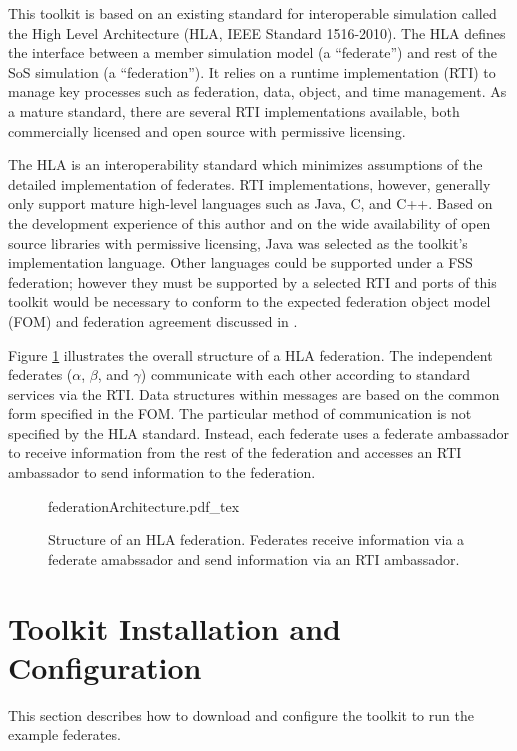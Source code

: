 \documentclass[]{article}
\begin{document}
This toolkit is based on an existing standard for interoperable simulation called the High Level Architecture (HLA, IEEE Standard 1516-2010). The HLA defines the interface between a member simulation model (a ``federate'') and rest of the SoS simulation (a ``federation''). It relies on a runtime implementation (RTI) to manage key processes such as federation, data, object, and time management. As a mature standard, there are several RTI implementations available, both commercially licensed and open source with permissive licensing.

The HLA is an interoperability standard which minimizes assumptions of the detailed implementation of federates. RTI implementations, however, generally only support mature high-level languages such as Java, C, and C++. Based on the development experience of this author and on the wide availability of open source libraries with permissive licensing, Java was selected as the toolkit's implementation language. Other languages could be supported under a FSS federation; however they must be supported by a selected RTI and ports of this toolkit would be necessary to conform to the expected federation object model (FOM) and federation agreement discussed in \textcite{grogan13}.

Figure \ref{fig:federationArchitecture} illustrates the overall structure of a HLA federation. The independent federates ($\alpha$, $\beta$, and $\gamma$) communicate with each other according to standard services via the RTI. Data structures within messages are based on the common form specified in the FOM. The particular method of communication is not specified by the HLA standard. Instead, each federate uses a federate ambassador to receive information from the rest of the federation and accesses an RTI ambassador to send information to the federation.

\begin{figure}
\centering
\small
{federationArchitecture.pdf_tex}
\caption{Structure of an HLA federation. Federates receive information via a federate amabssador and send information via an RTI ambassador.}
\label{fig:federationArchitecture}
\end{figure}

\section{Toolkit Installation and Configuration}

This section describes how to download and configure the toolkit to run the example federates. 
\end{document}
